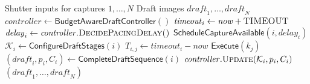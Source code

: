 \begin{algorithm}[t]
\caption{Capture Workflow with Admission and Pacing}
\label{alg:overview}
\footnotesize
\renewcommand{\algorithmicrequire}{\textbf{Input:}}
\renewcommand{\algorithmicensure}{\textbf{Output:}}
\begin{algorithmic}[1]
\Require Shutter inputs for captures $1,\ldots,N$
\Ensure Draft images $\mathit{draft}_1,\ldots,\mathit{draft}_N$
\State $\mathit{controller}\gets\textsf{BudgetAwareDraftController}()$
\State 
{}
  \State $\mathit{timeout}_i\gets\mathit{now}+\textsc{TIMEOUT}$ \label{alg:ov:timeout}
  \State $\mathit{delay}_i\gets\mathit{controller}.\Call{DecidePacingDelay()}{}$ \label{alg:ov:pacing}
  \State $\textsf{ScheduleCaptureAvailable}(i,\mathit{delay}_i)$ \label{alg:ov:notify}
  \State 
  \State $\mathcal K_i\gets\textsf{ConfigureDraftStages}(i)$ \label{alg:ov:configure}
    \State $T_{i,j}\gets\mathit{timeout}_i-\mathit{now}$
     \label{alg:ov:admission}
      \State $\textsf{Execute}(k_j)$
    \EndIf
  \EndFor
  \State $(\mathit{draft}_i,p_i,C_i)\gets\textsf{CompleteDraftSequence}(i)$ \label{alg:ov:publish}
  \State $\mathit{controller}.\Call{Update}{\mathcal K_i,p_i,C_i}$ \label{alg:ov:update}
\EndFor
\State \Return $(\mathit{draft}_1,\ldots,\mathit{draft}_N)$
\end{algorithmic}
\end{algorithm}
